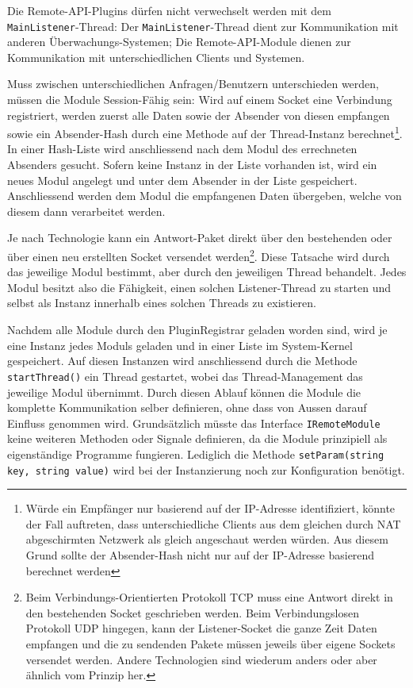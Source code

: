 Die Remote-API-Plugins d\"urfen nicht verwechselt werden mit dem \texttt{MainListener}-Thread: Der \texttt{MainListener}-Thread dient zur Kommunikation mit anderen \"Uberwachungs-Systemen; Die Remote-API-Module dienen zur Kommunikation mit unterschiedlichen Clients und Systemen.

Muss zwischen unterschiedlichen Anfragen/Benutzern unterschieden werden, m\"ussen die Module Session-F\"ahig sein: Wird auf einem Socket eine Verbindung registriert, werden zuerst alle Daten sowie der Absender von diesen empfangen sowie ein Absender-Hash durch eine Methode auf der Thread-Instanz berechnet\footnote{W\"urde ein Empf\"anger nur basierend auf der IP-Adresse identifiziert, k\"onnte der Fall auftreten, dass unterschiedliche Clients aus dem gleichen durch NAT abgeschirmten Netzwerk als gleich angeschaut werden w\"urden. Aus diesem Grund sollte der Absender-Hash nicht nur auf der IP-Adresse basierend berechnet werden}. In einer Hash-Liste wird anschliessend nach dem Modul des errechneten Absenders gesucht. Sofern keine Instanz in der Liste vorhanden ist, wird ein neues Modul angelegt und unter dem Absender in der Liste gespeichert. Anschliessend werden dem Modul die empfangenen Daten \"ubergeben, welche von diesem dann verarbeitet werden.

Je nach Technologie kann ein Antwort-Paket direkt \"uber den bestehenden oder \"uber einen neu erstellten Socket versendet werden\footnote{Beim Verbindungs-Orientierten Protokoll TCP muss eine Antwort direkt in den bestehenden Socket geschrieben werden. Beim Verbindungslosen Protokoll UDP hingegen, kann der Listener-Socket die ganze Zeit Daten empfangen und die zu sendenden Pakete m\"ussen jeweils \"uber eigene Sockets versendet werden. Andere Technologien sind wiederum anders oder aber \"ahnlich vom Prinzip her.}. Diese Tatsache wird durch das jeweilige Modul bestimmt, aber durch den jeweiligen Thread behandelt. Jedes Modul besitzt also die F\"ahigkeit, einen solchen Listener-Thread zu starten und selbst als Instanz innerhalb eines solchen Threads zu existieren.

Nachdem alle Module durch den PluginRegistrar geladen worden sind, wird je eine Instanz jedes Moduls geladen und in einer Liste im System-Kernel gespeichert. Auf diesen Instanzen wird anschliessend durch die Methode \texttt{startThread()} ein Thread gestartet, wobei das Thread-Management das jeweilige Modul \"ubernimmt. Durch diesen Ablauf k\"onnen die Module die komplette Kommunikation selber definieren, ohne dass von Aussen darauf Einfluss genommen wird. Grunds\"atzlich m\"usste das Interface \texttt{IRemoteModule} keine weiteren Methoden oder Signale definieren, da die Module prinzipiell als eigenst\"andige Programme fungieren. Lediglich die Methode \texttt{setParam(string key, string value)} wird bei der Instanzierung noch zur Konfiguration ben\"otigt.

